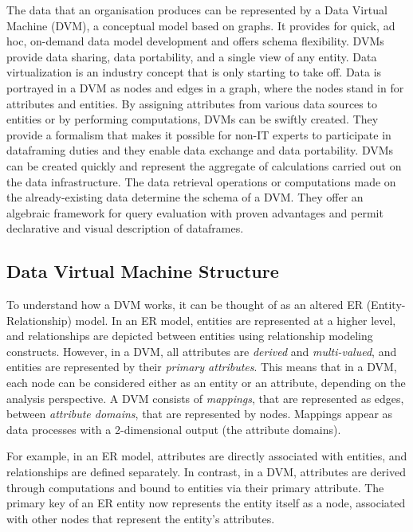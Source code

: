 The data that an organisation produces can be represented by a Data Virtual Machine (DVM), a conceptual model based on graphs. It provides for quick, ad hoc, on-demand data model development and offers schema flexibility. DVMs provide data sharing, data portability, and a single view of any entity. Data virtualization is an industry concept that is only starting to take off. Data is portrayed in a DVM as nodes and edges in a graph, where the nodes stand in for attributes and entities. By assigning attributes from various data sources to entities or by performing computations, DVMs can be swiftly created. They provide a formalism that makes it possible for non-IT experts to participate in dataframing duties and they enable data exchange and data portability. DVMs can be created quickly and represent the aggregate of calculations carried out on the data infrastructure. The data retrieval operations or computations made on the already-existing data determine the schema of a DVM. They offer an algebraic framework for query evaluation with proven advantages and permit declarative and visual description of dataframes\cite{chatziantoniou}.

\subsection{Data Virtual Machine Structure}

To understand how a DVM works, it can be thought of as an altered ER (Entity-Relationship) model. In an ER model, entities are represented at a higher level, and relationships are depicted between entities using relationship modeling constructs. However, in a DVM, all attributes are \textit{derived} and \textit{multi-valued}, and entities are represented by their \textit{primary attributes}. This means that in a DVM, each node can be considered either as an entity or an attribute, depending on the analysis perspective. A DVM consists of \textit{mappings}, that are represented as edges, between \textit{attribute domains}, that are represented by nodes. Mappings appear as data processes with a 2-dimensional output (the attribute domains)\cite{chatziantoniou}.

For example, in an ER model, attributes are directly associated with entities, and relationships are defined separately. In contrast, in a DVM, attributes are derived through computations and bound to entities via their primary attribute. The primary key of an ER entity now represents the entity itself as a node, associated with other nodes that represent the entity's attributes.

